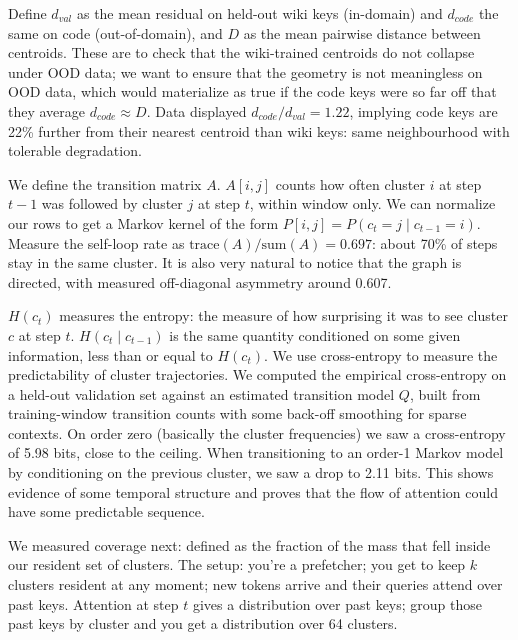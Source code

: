 \documentclass[11pt,a4paper]{article}
\begin{document}
Define $d_{val}$ as the mean residual on held-out wiki keys (in-domain) and $d_{code}$ the same on code (out-of-domain), and $D$ as the mean pairwise distance between centroids. These are to check that the wiki-trained centroids do not collapse under OOD data; we want to ensure that the geometry is not meaningless on OOD data, which would materialize as true if the code keys were so far off that they average $d_{code} \approx D$. Data displayed $d_{code}/d_{val} = 1.22$, implying code keys are 22\% further from their nearest centroid than wiki keys: same neighbourhood with tolerable degradation.

We define the transition matrix $A$. $A[i,j]$ counts how often cluster $i$ at step $t-1$ was followed by cluster $j$ at step $t$, within window only. We can normalize our rows to get a Markov kernel of the form $P[i,j] = P(c_t = j \mid c_{t-1} = i)$. Measure the self-loop rate as $\mathrm{trace}(A)/\mathrm{sum}(A) = 0.697$: about 70\% of steps stay in the same cluster. It is also very natural to notice that the graph is directed, with measured off-diagonal asymmetry around 0.607.

$H(c_t)$ measures the entropy: the measure of how surprising it was to see cluster $c$ at step $t$. $H(c_t \mid c_{t-1})$ is the same quantity conditioned on some given information, less than or equal to $H(c_t)$. We use cross-entropy to measure the predictability of cluster trajectories. We computed the empirical cross-entropy on a held-out validation set against an estimated transition model $Q$, built from training-window transition counts with some back-off smoothing for sparse contexts. On order zero (basically the cluster frequencies) we saw a cross-entropy of 5.98 bits, close to the ceiling. When transitioning to an order-1 Markov model by conditioning on the previous cluster, we saw a drop to 2.11 bits. This shows evidence of some temporal structure and proves that the flow of attention could have some predictable sequence.

We measured coverage next: defined as the fraction of the mass that fell inside our resident set of clusters. The setup: you're a prefetcher; you get to keep $k$ clusters resident at any moment; new tokens arrive and their queries attend over past keys. Attention at step $t$ gives a distribution over past keys; group those past keys by cluster and you get a distribution over 64 clusters.
\end{document}
